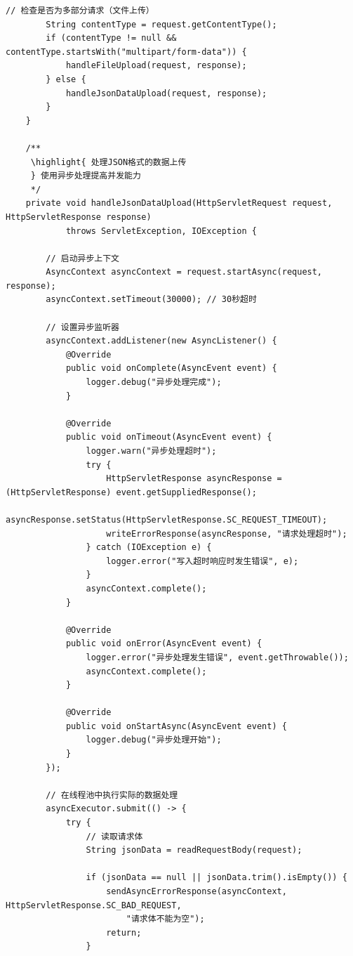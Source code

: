 \begin{lstlisting}[style=java]
        // 检查是否为多部分请求（文件上传）
        String contentType = request.getContentType();
        if (contentType != null && contentType.startsWith("multipart/form-data")) {
            handleFileUpload(request, response);
        } else {
            handleJsonDataUpload(request, response);
        }
    }
    
    /**
     \highlight{ 处理JSON格式的数据上传
     } 使用异步处理提高并发能力
     */
    private void handleJsonDataUpload(HttpServletRequest request, HttpServletResponse response) 
            throws ServletException, IOException {
        
        // 启动异步上下文
        AsyncContext asyncContext = request.startAsync(request, response);
        asyncContext.setTimeout(30000); // 30秒超时
        
        // 设置异步监听器
        asyncContext.addListener(new AsyncListener() {
            @Override
            public void onComplete(AsyncEvent event) {
                logger.debug("异步处理完成");
            }
            
            @Override
            public void onTimeout(AsyncEvent event) {
                logger.warn("异步处理超时");
                try {
                    HttpServletResponse asyncResponse = (HttpServletResponse) event.getSuppliedResponse();
                    asyncResponse.setStatus(HttpServletResponse.SC_REQUEST_TIMEOUT);
                    writeErrorResponse(asyncResponse, "请求处理超时");
                } catch (IOException e) {
                    logger.error("写入超时响应时发生错误", e);
                }
                asyncContext.complete();
            }
            
            @Override
            public void onError(AsyncEvent event) {
                logger.error("异步处理发生错误", event.getThrowable());
                asyncContext.complete();
            }
            
            @Override
            public void onStartAsync(AsyncEvent event) {
                logger.debug("异步处理开始");
            }
        });
        
        // 在线程池中执行实际的数据处理
        asyncExecutor.submit(() -> {
            try {
                // 读取请求体
                String jsonData = readRequestBody(request);
                
                if (jsonData == null || jsonData.trim().isEmpty()) {
                    sendAsyncErrorResponse(asyncContext, HttpServletResponse.SC_BAD_REQUEST, 
                        "请求体不能为空");
                    return;
                }
                

\end{lstlisting}
